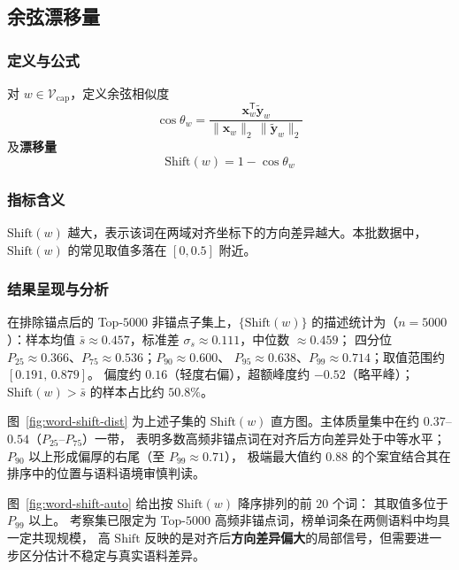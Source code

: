 \documentclass[withoutpreface]{cumcmthesis}
\begin{document}
\subsection{余弦漂移量}

\subsubsection{定义与公式}
对 $w\in\mathcal{V}_{\mathrm{cap}}$，定义余弦相似度
\begin{equation}
  \cos\theta_w
  = \frac{\mathbf{x}_w^{\mathsf{T}}\tilde{\mathbf{y}}_w}{\|\mathbf{x}_w\|_2\,\|\tilde{\mathbf{y}}_w\|_2}
\end{equation}
及\textbf{漂移量}
\begin{equation}
  \mathrm{Shift}(w)=1-\cos\theta_w 
\end{equation}

\subsubsection{指标含义}
$\mathrm{Shift}(w)$ 越大，表示该词在两域对齐坐标下的方向差异越大。本批数据中，$\mathrm{Shift}(w)$ 的常见取值多落在 $[0,0.5]$ 附近。

\subsubsection{结果呈现与分析}

在排除锚点后的 Top-$5000$ 非锚点子集上，$\{\mathrm{Shift}(w)\}$ 的描述统计为（$n{=}5000$）：样本均值
$\bar{s}\approx0.457$，标准差 $\sigma_s\approx0.111$，中位数 $\approx0.459$；
四分位 $P_{25}\approx0.366$、$P_{75}\approx0.536$；$P_{90}\approx0.600$、
$P_{95}\approx0.638$、$P_{99}\approx0.714$；取值范围约 $[0.191,\,0.879]$。
偏度约 $0.16$（轻度右偏），超额峰度约 $-0.52$（略平峰）；$\mathrm{Shift}(w)>\bar{s}$ 的样本占比约 $50.8\%$。

图~\ref{fig:word-shift-dist} 为上述子集的 $\mathrm{Shift}(w)$ 直方图。主体质量集中在约 $0.37$--$0.54$（$P_{25}$--$P_{75}$）一带，
表明多数高频非锚点词在对齐后方向差异处于中等水平；$P_{90}$ 以上形成偏厚的右尾（至 $P_{99}\approx0.71$），
极端最大值约 $0.88$ 的个案宜结合其在排序中的位置与语料语境审慎判读。

图~\ref{fig:word-shift-auto} 给出按 $\mathrm{Shift}(w)$ 降序排列的前 $20$ 个词：
其取值多位于 $P_{99}$ 以上。
考察集已限定为 Top-$5000$ 高频非锚点词，榜单词条在两侧语料中均具一定共现规模，
高 $\mathrm{Shift}$ 反映的是对齐后\textbf{方向差异偏大}的局部信号，但需要进一步区分估计不稳定与真实语料差异。
\end{document}
